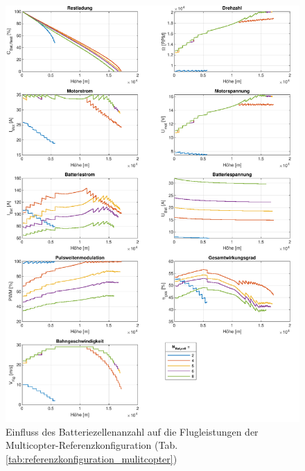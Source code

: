 \begin{figure}[H]
\centering
	\includegraphics[scale=0.70]{Diagramme/Untersuchung_N_Bat.pdf}
	\caption{Einfluss des Batteriezellenanzahl auf die Flugleistungen der Multicopter-Referenzkonfiguration (Tab. \ref{tab:referenzkonfiguration_mulitcopter})}
	\label{abb:N_Bat_einfluss}
\end{figure}

